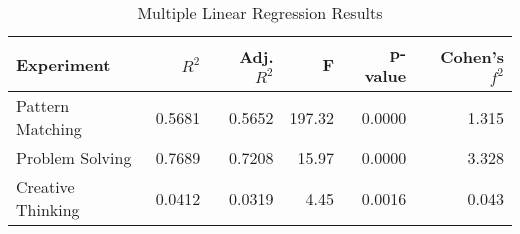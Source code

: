 \begin{table}[h]
\centering
\caption{Multiple Linear Regression Results}
\begin{tabular}{lrrrrr}
\toprule
Experiment & $R^2$ & Adj. $R^2$ & F & p-value & Cohen's $f^2$ \\
\midrule
Pattern Matching & 0.5681 & 0.5652 & 197.32 & 0.0000 & 1.315 \\
Problem Solving & 0.7689 & 0.7208 & 15.97 & 0.0000 & 3.328 \\
Creative Thinking & 0.0412 & 0.0319 & 4.45 & 0.0016 & 0.043 \\
\bottomrule
\end{tabular}
\end{table}
